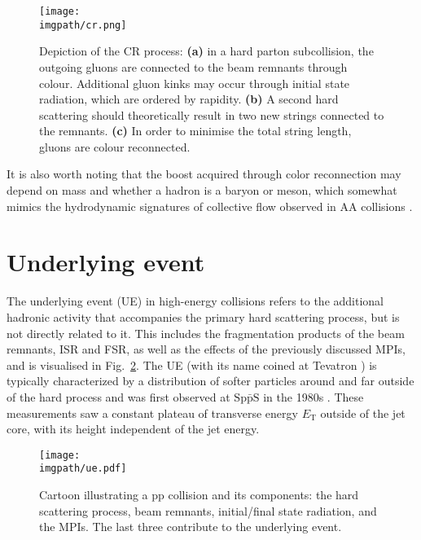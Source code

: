 \begin{figure}[H]
\texttt{[image: \\imgpath/cr.png]}
\caption{Depiction of the CR process: \textbf{(a)} in a hard parton subcollision, the outgoing gluons are connected to the beam remnants through colour. Additional gluon kinks may occur through initial state radiation, which are ordered by rapidity. \textbf{(b)} A second hard scattering should theoretically result in two new strings connected to the remnants. \textbf{(c)} In order to minimise the total string length, gluons are colour reconnected. \cite{gustafsonMultipleInteractionsSaturation2009}}
\label{fig:intro:cr}
\end{figure}

It is also worth noting that the \pt boost acquired through color reconnection may depend on mass and whether a hadron is a baryon or meson, which somewhat mimics the hydrodynamic signatures of collective flow observed in AA collisions \cite{ortizColorReconnectionFlowlike2013}.

\section{Underlying event}\label{sec:intro:ue}

The underlying event (UE) in high-energy collisions refers to the additional hadronic activity that accompanies the primary hard scattering process, but is not directly related to it. This includes the fragmentation products of the beam remnants, ISR and FSR, as well as the effects of the previously discussed MPIs, and is visualised in Fig.~\ref{fig:intro:ue}. The UE (with its name coined at Tevatron \cite{cdfcollaborationChargedJetEvolution2002}) is typically characterized by a distribution of softer particles around and far outside of the hard process and was first observed at $\mathrm{Sp\bar{p}S}$ in the 1980s \cite{arnisonHadronicJetProduction1983}. These measurements saw a constant plateau of transverse energy $E_\mathrm{T}$ outside of the jet core, with its height independent of the jet energy.

\begin{figure}[H]
\texttt{[image: \\imgpath/ue.pdf]}
\caption{Cartoon illustrating a pp collision and its components: the hard scattering process, beam remnants, initial/final state radiation, and the MPIs. The last three contribute to the underlying event. \cite{cainesUnderlyingEventStudies2009, cdfcollaborationChargedJetEvolution2002}}
\label{fig:intro:ue}
\end{figure}

